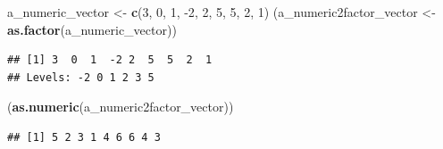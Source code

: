\documentclass[
  ignorenonframetext,
]{beamer}
\newenvironment{Shaded}{\begin{snugshade}}{\end{snugshade}}
\newcommand{\DecValTok}[1]{\textcolor[rgb]{0.00,0.00,0.81}{#1}}
\newcommand{\KeywordTok}[1]{\textcolor[rgb]{0.13,0.29,0.53}{\textbf{#1}}}
\newcommand{\NormalTok}[1]{#1}
\newcommand{\StringTok}[1]{\textcolor[rgb]{0.31,0.60,0.02}{#1}}
\begin{document}
\begin{frame}[fragile]

\begin{Shaded}
\begin{Highlighting}[]
\NormalTok{a_numeric_vector <-}\StringTok{ }\KeywordTok{c}\NormalTok{(}\DecValTok{3}\NormalTok{, }\DecValTok{0}\NormalTok{, }\DecValTok{1}\NormalTok{, }\DecValTok{-2}\NormalTok{, }\DecValTok{2}\NormalTok{, }\DecValTok{5}\NormalTok{, }\DecValTok{5}\NormalTok{, }\DecValTok{2}\NormalTok{, }\DecValTok{1}\NormalTok{)}
\NormalTok{(a_numeric2factor_vector <-}\StringTok{ }\KeywordTok{as.factor}\NormalTok{(a_numeric_vector))}
\end{Highlighting}
\end{Shaded}

\begin{verbatim}
## [1] 3  0  1  -2 2  5  5  2  1 
## Levels: -2 0 1 2 3 5
\end{verbatim}

\begin{Shaded}
\begin{Highlighting}[]
\NormalTok{(}\KeywordTok{as.numeric}\NormalTok{(a_numeric2factor_vector))}
\end{Highlighting}
\end{Shaded}

\begin{verbatim}
## [1] 5 2 3 1 4 6 6 4 3
\end{verbatim}

\end{frame}
\end{document}
